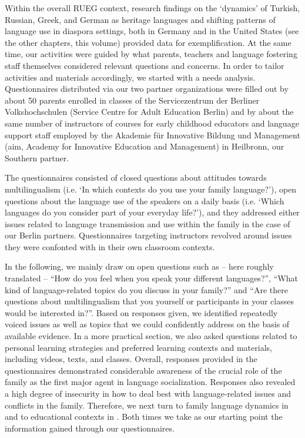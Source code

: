 \documentclass[output=paper,colorlinks,citecolor=brown]{langscibook}
\begin{document}
Within the overall RUEG context, research findings on the ‘dynamics’ of Turkish, Russian, Greek, and German as heritage languages and shifting patterns of language use in diaspora settings, both in Germany and in the United States (see the other chapters, this volume) provided data for exemplification. At the same time, our activities were guided by what parents, teachers and language fostering staff themselves considered relevant questions and concerns. In order to tailor activities and materials accordingly, we started with a needs analysis.  Questionnaires distributed via our two partner organizations were filled out by about 50 parents enrolled in classes of the Servicezentrum der Berliner Volkshochschulen (Service Centre for Adult Education Berlin) and by about the same number of instructors of courses for early childhood educators and language support staff employed by the Akademie für Innovative Bildung und Management (aim, Academy for Innovative Education and Management) in Heilbronn, our Southern partner.

The questionnaires consisted of closed questions about attitudes towards multilingualism (i.e. ‘In which contexts do you use your family language?’), open questions about the language use of the speakers on a daily basis (i.e. ‘Which languages do you consider part of your everyday life?’), and they addressed either issues related to language transmission and use within the family in the case of our Berlin partners. Questionnaires targeting instructors revolved around issues they were confonted with in their own classroom contexts.

In the following, we mainly draw on open questions such as  – here roughly  translated – “How do you feel when you speak your different languages?”, “What kind of language\hyp related topics do you discuss in your family?” and “Are there questions about multilingualism that you yourself or participants in your classes would be interested in?”. Based on responses given, we identified repeatedly voiced issues as well as topics that we could confidently address on the basis of available evidence. In a more practical section, we also asked questions related to personal learning strategies and preferred learning contexts and materials, including videos, texts, and classes.
Overall, responses provided in the questionnaires demonstrated considerable awareness of the crucial role of the family as the first major agent in language socialization. Responses also revealed a high degree of insecurity in how to deal best with language-related issues and conflicts in the family.  Therefore, we next turn to family language dynamics in  and to educational contexts in . Both times we take as our starting point the information gained through our questionnaires.
\end{document}

